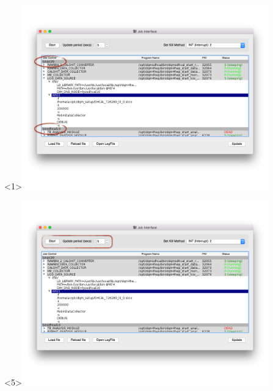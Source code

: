 \documentclass[8pt]{beamer}
\begin{document}
\begin{frame}
\begin{overlayarea}{\textwidth}{\textheight}
\begin{center}
        		\begin{onlyenv}<1>\includegraphics[width=0.8\textwidth]{figs/JobInterface/JobInterface_MultiHost.png}\end{onlyenv}
        		\begin{onlyenv}<5>\includegraphics[width=0.8\textwidth]{figs/JobInterface/JobInterface_Update.png}\end{onlyenv}
      \end{center}
    \end{overlayarea}
  \end{frame}
  
\end{document}
